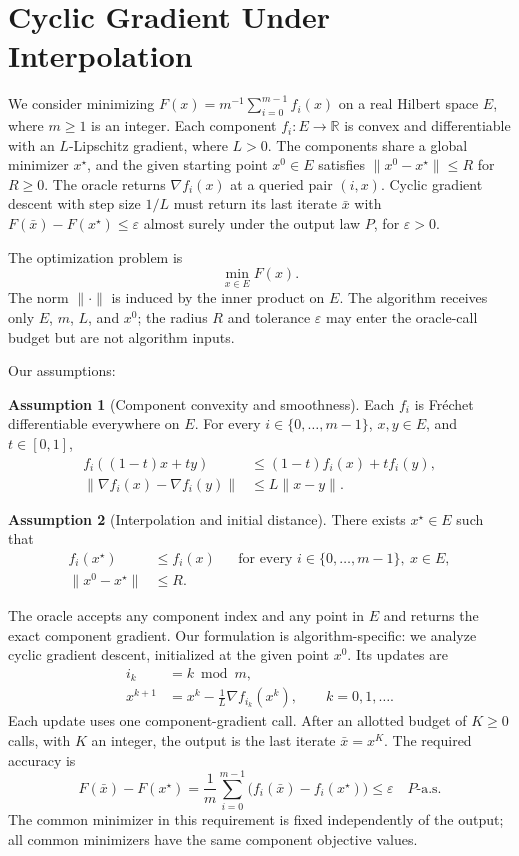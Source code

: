 \documentclass[10pt]{article}
\theoremstyle{definition}
\newtheorem{assumption}{Assumption}
\begin{document}
\section*{Cyclic Gradient Under Interpolation}
We consider minimizing $F(x)=m^{-1}\sum_{i=0}^{m-1}f_i(x)$ on a real Hilbert space $E$, where $m\geq1$ is an integer. Each component $f_i:E\to\mathbb{R}$ is convex and differentiable with an $L$-Lipschitz gradient, where $L>0$. The components share a global minimizer $x^\star$, and the given starting point $x^0\in E$ satisfies $\|x^0-x^\star\|\leq R$ for $R\geq0$. The oracle returns $\nabla f_i(x)$ at a queried pair $(i,x)$. Cyclic gradient descent with step size $1/L$ must return its last iterate $\bar{x}$ with $F(\bar{x})-F(x^\star)\leq\varepsilon$ almost surely under the output law $P$, for $\varepsilon>0$.

The optimization problem is
\[
\min_{x\in E} F(x).
\]
The norm $\|\cdot\|$ is induced by the inner product on $E$. The algorithm receives only $E$, $m$, $L$, and $x^0$; the radius $R$ and tolerance $\varepsilon$ may enter the oracle-call budget but are not algorithm inputs.

Our assumptions:
\begin{assumption}[Component convexity and smoothness]
Each $f_i$ is Fr\'echet differentiable everywhere on $E$. For every $i\in\{0,\ldots,m-1\}$, $x,y\in E$, and $t\in[0,1]$,
\[
\begin{aligned}
f_i((1-t)x+ty)&\leq(1-t)f_i(x)+t f_i(y),\\
\|\nabla f_i(x)-\nabla f_i(y)\|&\leq L\|x-y\|.
\end{aligned}
\]
\end{assumption}

\begin{assumption}[Interpolation and initial distance]
There exists $x^\star\in E$ such that
\[
\begin{aligned}
f_i(x^\star)&\leq f_i(x)
&&\text{for every }i\in\{0,\ldots,m-1\},\ x\in E,\\
\|x^0-x^\star\|&\leq R.
\end{aligned}
\]
\end{assumption}

The oracle accepts any component index and any point in $E$ and returns the exact component gradient. Our formulation is algorithm-specific: we analyze cyclic gradient descent, initialized at the given point $x^0$. Its updates are
\[
\begin{aligned}
i_k&=k\bmod m,\\
x^{k+1}&=x^k-\frac{1}{L}\nabla f_{i_k}(x^k),
\qquad k=0,1,\ldots.
\end{aligned}
\]
Each update uses one component-gradient call. After an allotted budget of $K\geq0$ calls, with $K$ an integer, the output is the last iterate $\bar{x}=x^K$. The required accuracy is
\[
F(\bar{x})-F(x^\star)
=\frac{1}{m}\sum_{i=0}^{m-1}\bigl(f_i(\bar{x})-f_i(x^\star)\bigr)
\leq\varepsilon
\quad P\text{-a.s.}
\]
The common minimizer in this requirement is fixed independently of the output; all common minimizers have the same component objective values.
\end{document}

